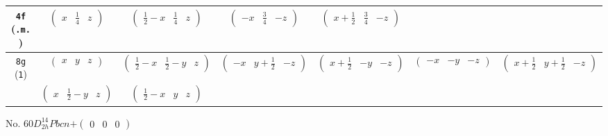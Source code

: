 \documentclass[fleqn,9pt,landscape]{jsarticle}
\begin{document}
\begin{center}
\begin{longtable}{ccccccc}
{\tt 4f} ({\tt .m.}) & $ \begin{pmatrix} x & \frac{1}{4} & z \end{pmatrix} $ & $ \begin{pmatrix} \frac{1}{2} - x & \frac{1}{4} & z \end{pmatrix} $ & $ \begin{pmatrix} - x & \frac{3}{4} & - z \end{pmatrix} $ & $ \begin{pmatrix} x + \frac{1}{2} & \frac{3}{4} & - z \end{pmatrix} $ & $  $ & $  $ \\ \hline
{\tt 8g} ({\tt 1}) & $ \begin{pmatrix} x & y & z \end{pmatrix} $ & $ \begin{pmatrix} \frac{1}{2} - x & \frac{1}{2} - y & z \end{pmatrix} $ & $ \begin{pmatrix} - x & y + \frac{1}{2} & - z \end{pmatrix} $ & $ \begin{pmatrix} x + \frac{1}{2} & - y & - z \end{pmatrix} $ & $ \begin{pmatrix} - x & - y & - z \end{pmatrix} $ & $ \begin{pmatrix} x + \frac{1}{2} & y + \frac{1}{2} & - z \end{pmatrix} $ \\
& $ \begin{pmatrix} x & \frac{1}{2} - y & z \end{pmatrix} $ & $ \begin{pmatrix} \frac{1}{2} - x & y & z \end{pmatrix} $ & $  $ & $  $ & $  $ & $  $ \\
\end{longtable}
\end{center}
\newpage
No. 60\quad$D_{2h}^{14}$\quad$Pbcn$\quad[ orthorhombic ]\quad$+\begin{pmatrix} 0 & 0 & 0 \end{pmatrix}$
\end{document}
